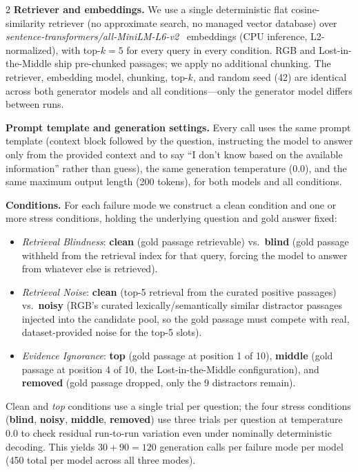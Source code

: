 \documentclass[11pt,a4paper]{article}
\begin{document}
\begin{multicols}{2}
\textbf{Retriever and embeddings.} We use a single deterministic flat cosine-similarity retriever (no approximate search, no managed vector database) over \textit{sentence-transformers/all-MiniLM-L6-v2}~\cite{reimers2019minilm} embeddings (CPU inference, L2-normalized), with top-$k=5$ for every query in every condition. RGB and Lost-in-the-Middle ship pre-chunked passages; we apply no additional chunking. The retriever, embedding model, chunking, top-$k$, and random seed (42) are identical across both generator models and all conditions---only the generator model differs between runs.

\textbf{Prompt template and generation settings.} Every call uses the same prompt template (context block followed by the question, instructing the model to answer only from the provided context and to say ``I don't know based on the available information'' rather than guess), the same generation temperature (0.0), and the same maximum output length (200 tokens), for both models and all conditions.

\textbf{Conditions.} For each failure mode we construct a clean condition and one or more stress conditions, holding the underlying question and gold answer fixed:
\begin{itemize}[leftmargin=*,nosep]
\item \textit{Retrieval Blindness}: \textbf{clean} (gold passage retrievable) vs.\ \textbf{blind} (gold passage withheld from the retrieval index for that query, forcing the model to answer from whatever else is retrieved).
\item \textit{Retrieval Noise}: \textbf{clean} (top-5 retrieval from the curated positive passages) vs.\ \textbf{noisy} (RGB's curated lexically/semantically similar distractor passages injected into the candidate pool, so the gold passage must compete with real, dataset-provided noise for the top-5 slots).
\item \textit{Evidence Ignorance}: \textbf{top} (gold passage at position 1 of 10), \textbf{middle} (gold passage at position 4 of 10, the Lost-in-the-Middle configuration), and \textbf{removed} (gold passage dropped, only the 9 distractors remain).
\end{itemize}
Clean and \textit{top} conditions use a single trial per question; the four stress conditions (\textbf{blind}, \textbf{noisy}, \textbf{middle}, \textbf{removed}) use three trials per question at temperature 0.0 to check residual run-to-run variation even under nominally deterministic decoding. This yields $30 + 90 = 120$ generation calls per failure mode per model (450 total per model across all three modes).


\end{multicols}
\end{document}
